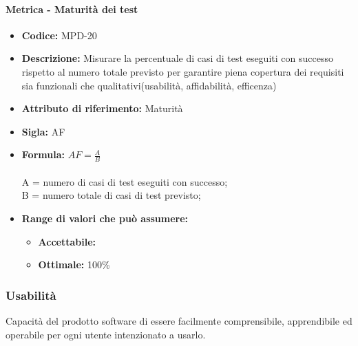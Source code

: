                   \paragraph{Metrica - Maturità dei test} 
            \begin{itemize}
           \item   \textbf{Codice:} MPD-20
            \item  \textbf{Descrizione:} Misurare la percentuale di casi di test eseguiti con successo rispetto al numero totale previsto per garantire piena copertura dei requisiti sia funzionali che qualitativi(usabilità, affidabilità, efficenza)
              \item   \textbf{Attributo di riferimento:} Maturità
          \item    \textbf{Sigla:} AF
           \item   \textbf{Formula:} \begin{math}AF = \frac{A}{B}\end{math}\\ \\
            A = numero di casi di test eseguiti con successo;\\
            B = numero totale di casi di test previsto;
            \item \textbf{Range di valori che può assumere:}
        \begin{itemize}
            \item \textbf{Accettabile:} 
            \item \textbf{Ottimale:} 100\%
        \end{itemize}
       \end{itemize}
       
              \subsubsection{Usabilità}
   Capacità del prodotto software di essere facilmente comprensibile, apprendibile ed operabile per ogni utente intenzionato a usarlo.
   
